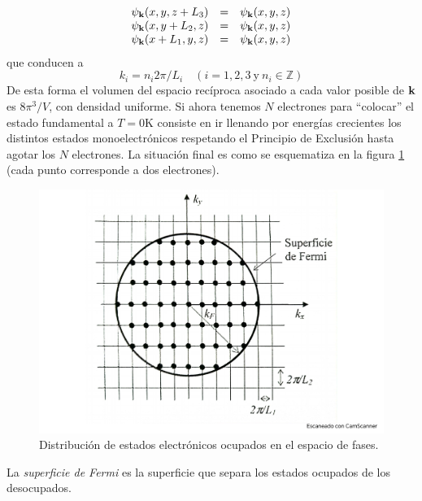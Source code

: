 \begin{equation}
    \begin{array}{ccc}
    \psi_{\mathbf{k}} (x,y,z+L_3) & = & \psi_{\mathbf{k}} (x,y,z) \\
    \psi_{\mathbf{k}} (x,y+L_2,z) & = & \psi_{\mathbf{k}} (x,y,z) \\
    \psi_{\mathbf{k}} (x+L_1,y,z) & = & \psi_{\mathbf{k}} (x,y,z) \\
    \end{array}
\end{equation}
que conducen a 
\begin{equation}
    k_i = n_i 2 \pi / L_i \quad (i=1,2,3 \ \text{y} \ n_i \in \mathbb{Z})
\end{equation}
De esta forma el volumen del espacio recíproca asociado a cada valor posible de $\mathbf{k}$ es $8\pi^3 /V$, con densidad uniforme. Si ahora tenemos $N$ electrones para ``colocar'' el estado fundamental a $T=0$K consiste en ir llenando por energías crecientes los distintos estados monoelectrónicos respetando el Principio de Exclusión hasta agotar los $N$ electrones. La situación final es como se esquematiza en la figura \ref{Fig:06-01} (cada punto corresponde a dos electrones).

\begin{figure}[h!] \centering
    \includegraphics[scale=0.35]{Cuerpo/Ch_06/Fotos libro 1.pdf}
    \caption{Distribución de estados electrónicos ocupados en el espacio de fases.}
    \label{Fig:06-01}
\end{figure}    

La \textit{superficie de Fermi} es la superficie que separa los estados ocupados de los desocupados.

